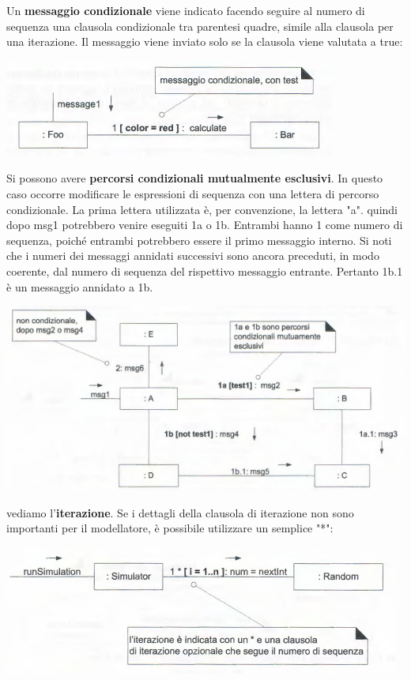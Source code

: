 \documentclass[a4paper,12pt, oneside]{book}
\begin{document}
Un \textbf{messaggio condizionale} viene indicato facendo seguire al numero di sequenza una clausola condizionale tra parentesi quadre, simile alla clausola per una iterazione. Il messaggio viene inviato solo se la clausola viene valutata a true:
\begin{center}
	\includegraphics[scale=0.7]{img/comd6.png}
\end{center}
Si possono avere \textbf{percorsi condizionali mutualmente esclusivi}. In questo caso occorre modificare le espressioni di sequenza con una lettera di percorso
condizionale. La prima lettera utilizzata è, per convenzione, la lettera "a". quindi dopo msg1 potrebbero venire eseguiti 1a o 1b. Entrambi hanno 1 come numero di sequenza, poiché entrambi potrebbero essere il primo messaggio interno. Si noti che i numeri dei messaggi annidati successivi sono ancora preceduti, in modo coerente, dal numero di sequenza del rispettivo messaggio entrante. Pertanto 1b.1 è un
messaggio annidato a 1b.
\begin{center}
	\includegraphics[scale=0.6]{img/comd7.png}
\end{center}
vediamo l'\textbf{iterazione}. Se i dettagli della clausola di iterazione non sono importanti per il modellatore, è possibile utilizzare un semplice "*":
\begin{center}
	\includegraphics[scale=0.6]{img/comd8.png}
\end{center}
\end{document}
